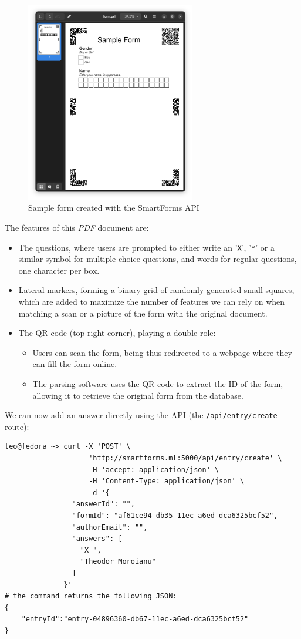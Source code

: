 \documentclass[11pt, a4paper]{report}
\def\code#1{\texttt{#1}}
\begin{document}
\begin{figure}[!h]
    \centering
    \includegraphics[width=20em]{images/screenshoots/sample_form.png}
    \caption{Sample form created with the SmartForms API}
    \label{simple-form-preview}
\end{figure}

The features of this \textit{PDF} document are:
\begin{itemize}
    \item The questions, where users are prompted to either write an '\code{X}', '\code{*}' or a similar symbol for multiple-choice questions, and words for regular questions, one character per box.
    \item Lateral markers, forming a binary grid of randomly generated small squares, which are added to maximize the number of features we can rely on when matching a scan or a picture of the form with the original document.
    \item The QR code (top right corner), playing a double role:
    \begin{itemize}
        \item Users can scan the form, being thus redirected to a webpage where they can fill the form online.
        \item The parsing software uses the QR code to extract the ID of the form, allowing it to retrieve the original form from the database.
    \end{itemize}
\end{itemize}

We can now add an answer directly using the API (the \code{/api/entry/create} route):

\begin{verbatim}
teo@fedora ~> curl -X 'POST' \
                    'http://smartforms.ml:5000/api/entry/create' \
                    -H 'accept: application/json' \
                    -H 'Content-Type: application/json' \
                    -d '{
                "answerId": "",
                "formId": "af61ce94-db35-11ec-a6ed-dca6325bcf52",
                "authorEmail": "",
                "answers": [
                  "X ",
                  "Theodor Moroianu"
                ]
              }'
# the command returns the following JSON:
{
    "entryId":"entry-04896360-db67-11ec-a6ed-dca6325bcf52"
}
\end{verbatim}
\end{document}
